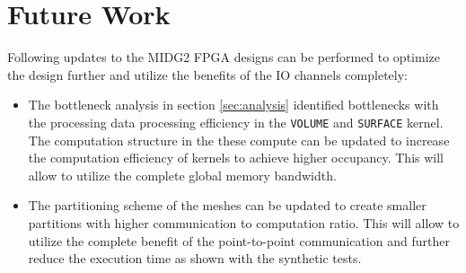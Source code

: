 \section{Future Work}

Following updates to the MIDG2 FPGA designs can be performed to optimize the design
further and utilize the benefits of the IO channels completely:

\begin{itemize}
    \item The bottleneck analysis in section \ref{sec:analysis} identified bottlenecks with the
    processing data processing efficiency in the \texttt{VOLUME} and \texttt{SURFACE} kernel. The computation structure
    in the these compute can be updated to increase the computation efficiency of kernels to achieve
    higher occupancy. This will allow to utilize the complete global memory bandwidth.
    \item The partitioning scheme of the meshes can be updated to create smaller partitions with
    higher communication to computation ratio. This will allow to utilize the complete
    benefit of the point-to-point communication and further reduce the execution time
    as shown with the synthetic tests.
\end{itemize}




